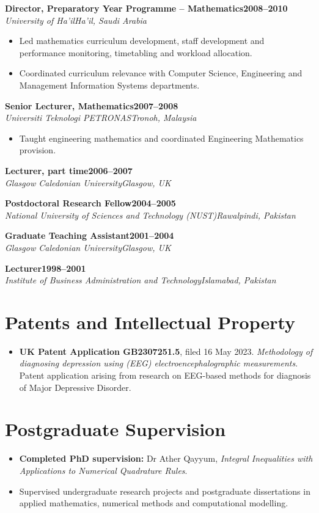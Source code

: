 \documentclass[10pt,a4paper]{article}
\newcommand{\cvrole}[4]{\textbf{#1}\hfill\textbf{#2}\\[-1pt]\textit{#3}\hfill\textit{#4}\par}
\begin{document}
\cvrole{Director, Preparatory Year Programme -- Mathematics}{2008--2010}{University of Ha'il}{Ha'il, Saudi Arabia}
\begin{itemize}
\item Led mathematics curriculum development, staff development and performance monitoring, timetabling and workload allocation.
\item Coordinated curriculum relevance with Computer Science, Engineering and Management Information Systems departments.
\end{itemize}

\cvrole{Senior Lecturer, Mathematics}{2007--2008}{Universiti Teknologi PETRONAS}{Tronoh, Malaysia}
\begin{itemize}\item Taught engineering mathematics and coordinated Engineering Mathematics provision.\end{itemize}
\cvrole{Lecturer, part time}{2006--2007}{Glasgow Caledonian University}{Glasgow, UK}
\cvrole{Postdoctoral Research Fellow}{2004--2005}{National University of Sciences and Technology (NUST)}{Rawalpindi, Pakistan}
\cvrole{Graduate Teaching Assistant}{2001--2004}{Glasgow Caledonian University}{Glasgow, UK}
\cvrole{Lecturer}{1998--2001}{Institute of Business Administration and Technology}{Islamabad, Pakistan}

\section{Patents and Intellectual Property}
\begin{itemize}
\item \textbf{UK Patent Application GB2307251.5}, filed 16 May 2023. \textit{Methodology of diagnosing depression using (EEG) electroencephalographic measurements}. Patent application arising from research on EEG-based methods for diagnosis of Major Depressive Disorder.
\end{itemize}



\section{Postgraduate Supervision}
\begin{itemize}
\item \textbf{Completed PhD supervision:} Dr Ather Qayyum, \textit{Integral Inequalities with Applications to Numerical Quadrature Rules}.
\item Supervised undergraduate research projects and postgraduate dissertations in applied mathematics, numerical methods and computational modelling.
\end{itemize}
\end{document}
